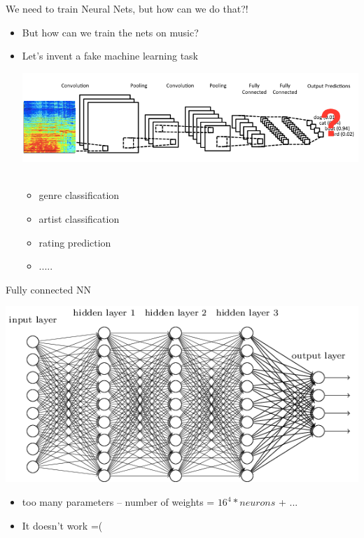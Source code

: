 \documentclass{beamer}
\begin{document}
\begin{frame}{We need to train Neural Nets, but how can we do that?!}
	\begin{itemize}
		\item But how can we train the nets on music? 
		\item Let's invent a fake machine learning task

		\includegraphics[scale=0.4]{img/cnn_what2predict}~~~~~~~~~

		\begin{itemize}
			\item genre classification
			\item artist classification
			\item rating prediction
			\item .....
		\end{itemize}
	\end{itemize} 
	
\end{frame}

\begin{frame}{Fully connected NN} 
		\begin{center}
			\includegraphics[scale=0.5]{img/fc}
		\end{center}
		\begin{itemize}
			\item too many parameters -- number of weights = $16^4 * neurons$ + ... 
			\item It doesn't work =( 
		\end{itemize}
\end{frame}
\end{document}
